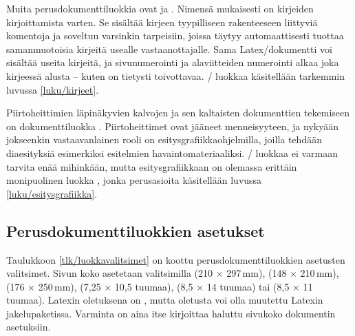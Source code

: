 Muita perusdokumenttiluokkia ovat  ja .
Nimensä mukaisesti  on kirjeiden kirjoittamista varten.
Se sisältää kirjeen tyypilliseen rakenteeseen liittyviä komentoja ja
soveltuu varsinkin tarpeisiin, joissa täytyy automaattisesti tuottaa
samanmuotoisia kirjeitä usealle vastaanottajalle. Sama
Latex\-/dokumentti voi sisältää useita kirjeitä, ja sivunumerointi ja
alaviitteiden numerointi alkaa joka kirjeessä alusta -- kuten on
tietysti toivottavaa. \-/ luokkaa käsitellään tarkemmin
luvussa \ref{luku/kirjeet}.

Piirtoheittimien läpinäkyvien kalvojen ja sen kaltaisten dokumenttien
tekemiseen on dokumenttiluokka . Piirtoheittimet ovat
jääneet menneisyyteen, ja nykyään jokseenkin vastaavanlainen rooli on
esitysgrafiikkaohjelmilla, joilla tehdään diaesityksiä esimerkiksi
esitelmien havaintomateriaaliksi. \-/ luokkaa ei varmaan
tarvita enää mihinkään, mutta esitysgrafiikkaan on olemassa erittäin
monipuolinen luokka , jonka perusasioita käsitellään
luvussa \ref{luku/esitysgrafiikka}.

\subsection{Perusdokumenttiluokkien asetukset}
\label{luku/perusdokumenttiluokat-asetukset}

Taulukkoon \ref{tlk/luokkavalitsimet} on koottu perusdokumenttiluokkien
asetusten valitsimet. Sivun koko asetetaan valitsimilla
 (210 × 297\,mm),  (148 × 210\,mm),
 (176 × 250\,mm),  (7,25 ×
10,5 tuumaa),  (8,5 × 14 tuumaa) tai
 (8,5 × 11 tuumaa). Latexin oletuksena on
, mutta oletusta voi olla muutettu Latexin
jakelupaketissa. Varminta on aina itse kirjoittaa haluttu sivukoko
dokumentin asetuksiin.


